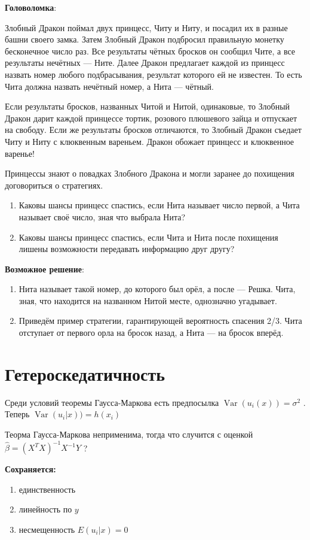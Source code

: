 \documentclass[12pt]{article} %
\theoremstyle{definition} %
\DeclareMathOperator{\Var}{Var}
\begin{document}
\textbf{Головоломка}:
\par Злобный Дракон поймал двух принцесс, Читу и Ниту, и посадил
их в разные башни своего замка. Затем Злобный Дракон подбросил
правильную монетку бесконечное число раз. Все результаты
чётных бросков он сообщил Чите, а все результаты нечётных —
Ните. Далее Дракон предлагает каждой из принцесс назвать номер
любого подбрасывания, результат которого ей не известен. То есть
Чита должна назвать нечётный номер, а Нита — чётный.
\par
Если результаты бросков, названных Читой и Нитой, одинаковые,
то Злобный Дракон дарит каждой принцессе тортик, розового
плюшевого зайца и отпускает на свободу. Если же результаты
бросков отличаются, то Злобный Дракон съедает Читу и Ниту с
клюквенным вареньем. Дракон обожает принцесс и клюквенное
варенье!
\par Принцессы знают о повадках Злобного Дракона и могли заранее до похищения договориться о стратегиях.
\begin{enumerate}
\item{Каковы шансы принцесс спастись, если Нита называет число
первой, а Чита называет своё число, зная что выбрала Нита?}
\item{Каковы шансы принцесс спастись, если Чита и Нита после
похищения лишены возможности передавать информацию
друг другу?}
\end{enumerate}
\textbf{Возможное решение}:
\begin{enumerate}
\item{Нита называет такой номер, до которого был орёл, а после —
Решка. Чита, зная, что находится на названном Нитой месте,
однозначно угадывает.}
\item{Приведём пример стратегии, гарантирующей вероятность спасения 2/3. Чита отступает от первого орла на бросок назад, а Нита — на бросок вперёд.}
\end{enumerate}

\section{Гетероскедатичность}

Среди условий теоремы Гаусса-Маркова есть предпосылка $\Var(u_i(x)) = \sigma ^2 $ . Теперь  $\Var(u_i | x)) = h(x_i)$

Теорма Гаусса-Маркова неприменима, тогда что случится с оценкой $\hat{\beta}  = (X^T X)^{-1} X^{-1} Y$   ?

\textbf{Сохраняется:}

\begin{enumerate}
\item единственность
\item линейность по $y$
\item несмещенность $E(u_i |x) = 0$
\end{enumerate}
\end{document}
